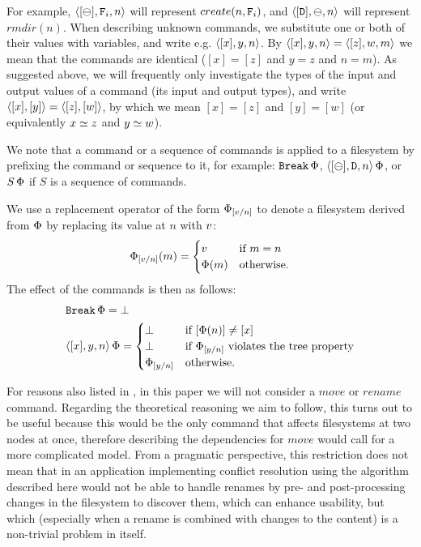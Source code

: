 For example, $\langle{[\ominus],\mathtt{F}_i,n}\rangle$ will represent $create(n,\mathtt{F}_i)$,
and $\langle{[\mathtt{D}],\ominus,n}\rangle$ will represent $rmdir(n)$.
When describing unknown commands, we substitute one or both
of their values with variables, and write e.g. $\langle{[x],y,n}\rangle$.
By $\langle{[x],y,n}\rangle=\langle{[z],w,m}\rangle$ we mean that the commands are identical
($[x]=[z]$ and $y=z$ and $n=m$).
As suggested above, we will frequently only investigate
the types of the input and output values of a command
(its input and output types), and write
$\langle{[x],[y]}\rangle=\langle{[z],[w]}\rangle$, by which we mean $[x]=[z]$ and $[y]=[w]$
(or equivalently $x\simeq z$ and $y\simeq w$).

We note that a command or a sequence of commands is applied to a filesystem
by prefixing the command or sequence to it, for example: $\mathtt{Break}\,\Phi$, $\langle{[\ominus],\mathtt{D},n}\rangle\,\Phi$, 
or $S\,\Phi$ if $S$ is a sequence of commands.

\begin{mydef}
We use a replacement operator of the form
$\Phi_{[v/n]}$ to denote a filesystem derived from $\Phi$ 
by replacing its value at $n$ with $v$:
\[ \Phi_{[v/n]}(m) =
   \begin{cases}
   v &\mbox{if~} m=n\\
   \Phi(m) &\mbox{otherwise.}
   \end{cases}
\]
The effect of the commands is then as follows:
\begin{align*}
&\mathtt{Break}\,\Phi = \bot \\
&\langle{[x],y,n}\rangle\,\Phi = 
   \begin{cases}
   \bot &\mbox{if~} [\Phi(n)]\neq[x]\\
   \bot &\mbox{if~} \Phi_{[y/n]} \mbox{~violates the tree property}\\
   \Phi_{[y/n]} &\mbox{otherwise.}
   \end{cases}
\end{align*}
\end{mydef}



\bigskip

\noindent
For reasons also listed in \cite{NREC}, in this paper we will not consider
a $move$ or $rename$ command. Regarding the theoretical reasoning we aim to follow,
this turns out to be useful because this would be the only command that affects
filesystems at two nodes at once, therefore describing 
the dependencies for $move$ would call for a more complicated model.
From a pragmatic perspective, this restriction does not mean that in an application
implementing conflict resolution using the algorithm described here would not be
able to handle renames by pre- and post-processing changes in the filesystem to
discover them, which can enhance usability, but which
(especially when a rename is combined with changes to the content)
is a non-trivial problem in itself.
